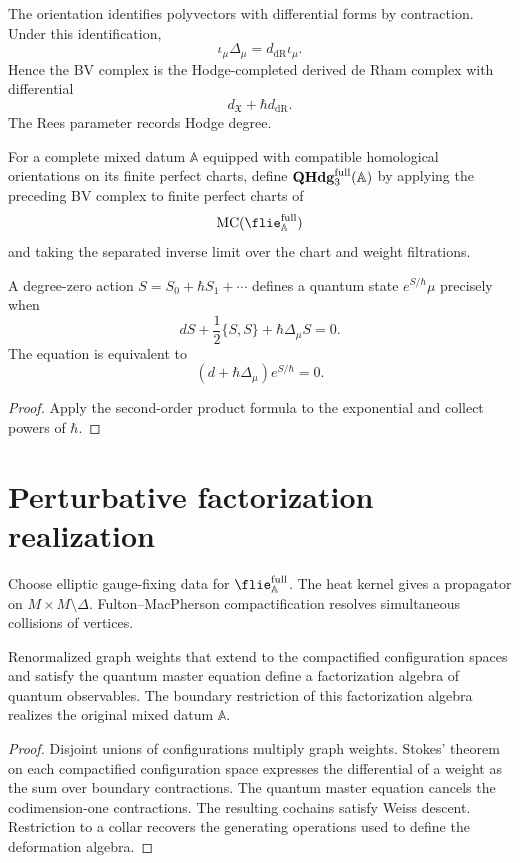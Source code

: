 The orientation identifies polyvectors with differential forms by contraction.  Under this identification,
\[
 \iota_\mu\Delta_\mu=d_{\mathrm{dR}}\iota_\mu.
\]
Hence the BV complex is the Hodge-completed derived de Rham complex with differential
\[
 d_{\mathfrak X}+\hbar d_{\mathrm{dR}}.
\]
The Rees parameter records Hodge degree.

\begin{definition}
For a complete mixed datum $\mathbb A$ equipped with compatible homological orientations on its finite perfect charts, define $\mathbf{QHdg}_3^{\mathrm{full}}(\mathbb A)$ by applying the preceding BV complex to finite perfect charts of
\[
 \MC(\flie_{\mathbb A}^{\mathrm{full}})
\]
and taking the separated inverse limit over the chart and weight filtrations.
\end{definition}

\begin{theorem}
A degree-zero action $S=S_0+\hbar S_1+\cdots$ defines a quantum state $e^{S/\hbar}\mu$ precisely when
\[
 dS+\frac12\{S,S\}+\hbar\Delta_\mu S=0.
\]
The equation is equivalent to
\[
 (d+\hbar\Delta_\mu)e^{S/\hbar}=0.
\]
\end{theorem}
\begin{proof}
Apply the second-order product formula to the exponential and collect powers of $\hbar$.
\end{proof}

\chapter{Perturbative factorization realization}
Choose elliptic gauge-fixing data for $\flie_{\mathbb A}^{\mathrm{full}}$.  The heat kernel gives a propagator on $M\times M\setminus\Delta$.  Fulton--MacPherson compactification resolves simultaneous collisions of vertices.

\begin{theorem}
Renormalized graph weights that extend to the compactified configuration spaces and satisfy the quantum master equation define a factorization algebra of quantum observables.  The boundary restriction of this factorization algebra realizes the original mixed datum $\mathbb A$.
\end{theorem}
\begin{proof}
Disjoint unions of configurations multiply graph weights.  Stokes' theorem on each compactified configuration space expresses the differential of a weight as the sum over boundary contractions.  The quantum master equation cancels the codimension-one contractions.  The resulting cochains satisfy Weiss descent.  Restriction to a collar recovers the generating operations used to define the deformation algebra.
\end{proof}

